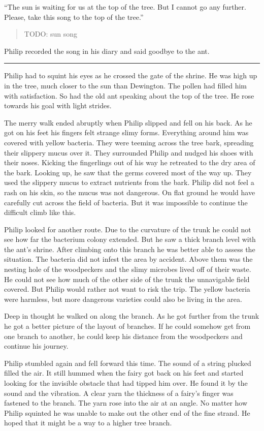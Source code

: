 \documentclass[10pt, draft]{memoir}
\renewcommand{\pfbreakdisplay}{\bigskip \ding{166} \bigskip}
\newcommand{\secbreak}{\fancybreak{\pfbreakdisplay}}
\begin{document}
``The sun is waiting for us at the top of the tree. But I cannot go any further. Please, take this song to the top of the tree.”


\begin{verse}
TODO: sun song
\end{verse}


Philip recorded the song in his diary and said goodbye to the ant.

\secbreak

Philip had to squint his eyes as he crossed the gate of the shrine. He was high up in the tree, much closer to the sun than Dewington. The pollen had filled him with satisfaction. So had the old ant speaking about the top of the tree. He rose towards his goal with light strides.

The merry walk ended abruptly when Philip slipped and fell on his back. As he got on his feet his fingers felt strange slimy forms. Everything around him was covered with yellow bacteria. They were teeming across the tree bark, spreading their slippery mucus over it. They surrounded Philip and nudged his shoes with their noses. Kicking the fingerlings out of his way he retreated to the dry area of the bark. Looking up, he saw that the germs covered most of the way up. They used the slippery mucus to extract nutrients from the bark. Philip did not feel a rash on his skin, so the mucus was not dangerous. On flat ground he would have carefully cut across the field of bacteria. But it was impossible to continue the difficult climb like this.

Philip looked for another route. Due to the curvature of the trunk he could not see how far the bacterium colony extended. But he saw a thick branch level with the ant's shrine. After climbing onto this branch he was better able to assess the situation. The bacteria did not infest the area by accident. Above them was the nesting hole of the woodpeckers and the slimy microbes lived off of their waste. He could not see how much of the other side of the trunk the unnavigable field covered. But Philip would rather not want to risk the trip. The yellow bacteria were harmless, but more dangerous varieties could also be living in the area.

Deep in thought he walked on along the branch. As he got further from the trunk he got a better picture of the layout of branches. If he could somehow get from one branch to another, he could keep his distance from the woodpeckers and continue his journey.

Philip stumbled again and fell forward this time. The sound of a string plucked filled the air. It still hummed when the fairy got back on his feet and started looking for the invisible obstacle that had tipped him over. He found it by the sound and the vibration. A clear yarn the thickness of a fairy's finger was fastened to the branch. The yarn rose into the air at an angle. No matter how Philip squinted he was unable to make out the other end of the fine strand. He hoped that it might be a way to a higher tree branch.
\end{document}
